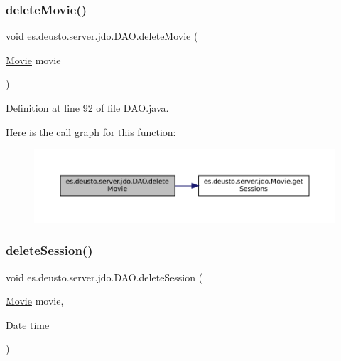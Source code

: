 \subsubsection{\texorpdfstring{deleteMovie()}{deleteMovie()}\hspace{0.1cm}{\footnotesize\ttfamily [2/2]}}
{\footnotesize\ttfamily void es.\+deusto.\+server.\+jdo.\+D\+A\+O.\+delete\+Movie (\begin{DoxyParamCaption}\item[{\mbox{\hyperlink{classes_1_1deusto_1_1server_1_1jdo_1_1_movie}{Movie}}}]{movie }\end{DoxyParamCaption})}



Definition at line 92 of file D\+A\+O.\+java.

Here is the call graph for this function\+:
\nopagebreak
\begin{figure}[H]
\begin{center}
\leavevmode
\includegraphics[width=350pt]{classes_1_1deusto_1_1server_1_1jdo_1_1_d_a_o_a479ca9a8597aada4e74445699140e0fd_cgraph}
\end{center}
\end{figure}
\mbox{\label{classes_1_1deusto_1_1server_1_1jdo_1_1_d_a_o_a399605bc2a2fd86679ddf7793b71de12}} 
\subsubsection{\texorpdfstring{deleteSession()}{deleteSession()}\hspace{0.1cm}{\footnotesize\ttfamily [1/2]}}
{\footnotesize\ttfamily void es.\+deusto.\+server.\+jdo.\+D\+A\+O.\+delete\+Session (\begin{DoxyParamCaption}\item[{\mbox{\hyperlink{classes_1_1deusto_1_1server_1_1jdo_1_1_movie}{Movie}}}]{movie,  }\item[{Date}]{time }\end{DoxyParamCaption})}



